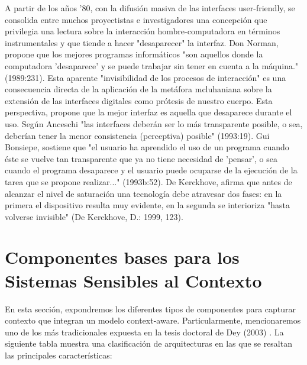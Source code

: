 A partir de los años ’80, con la difusión masiva de las interfaces
user-friendly, se
consolida entre muchos proyectistas e investigadores una concepción que
privilegia una
lectura sobre la interacción hombre-computadora en términos instrumentales y que
tiende a hacer "desaparecer" la interfaz. Don Norman, propone que los mejores
programas informáticos "son aquellos donde la computadora 'desaparece’ y se
puede
trabajar sin tener en cuenta a la máquina." (1989:231). Esta aparente
"invisibilidad de
los procesos de interacción" es una consecuencia directa de la aplicación de la
metáfora
mcluhaniana sobre la extensión de las interfaces digitales como prótesis de
nuestro
cuerpo. Esta perspectiva, propone que la mejor interfaz es aquella que
desaparece
durante el uso. Según Anceschi "las interfaces deberán ser lo más transparente
posible,
o sea, deberían tener la menor consistencia (perceptiva) posible" (1993:19). Gui
Bonsiepe, sostiene que "el usuario ha aprendido el uso de un programa cuando
éste se
vuelve tan transparente que ya no tiene necesidad de 'pensar’, o sea cuando el
programa desaparece y el usuario puede ocuparse de la ejecución de la tarea que
se
propone realizar..." (1993b:52). De Kerckhove, afirma que antes de alcanzar el
nivel de
saturación una tecnología debe atravesar dos fases: en la primera el dispositivo
resulta
muy evidente, en la segunda se interioriza "hasta volverse invisible" (De
Kerckhove, D.:
1999, 123).



\section{Componentes bases para los Sistemas Sensibles al Contexto}
  
En esta sección, expondremos los diferentes tipos de componentes para capturar
contexto que integran un modelo context-aware. Particularmente, mencionaremos
uno
de los más tradicionales expuesta en la tesis doctoral de Dey (2003) \cite{dey}.
La siguiente tabla muestra una clasificación de arquitecturas en las que se
resaltan las
principales características:



